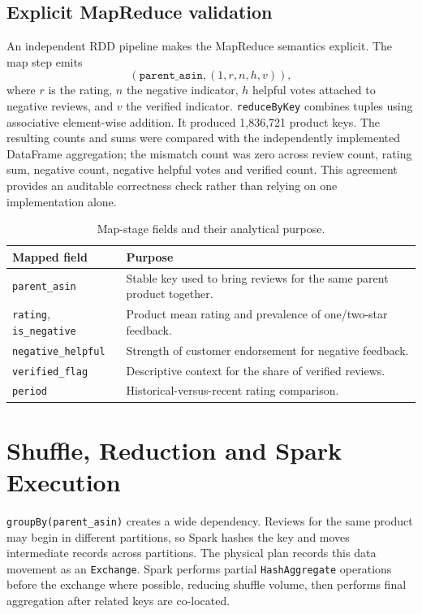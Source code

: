 \documentclass[10pt,a4paper]{article}
\begin{document}
\subsection{Explicit MapReduce validation}

An independent RDD pipeline makes the MapReduce semantics explicit. The map step emits
\[
(\texttt{parent\_asin},(1,r,n,h,v)),
\]
where $r$ is the rating, $n$ the negative indicator, $h$ helpful votes attached to negative reviews, and $v$ the verified indicator. \texttt{reduceByKey} combines tuples using associative element-wise addition. It produced 1,836,721 product keys. The resulting counts and sums were compared with the independently implemented DataFrame aggregation; the mismatch count was zero across review count, rating sum, negative count, negative helpful votes and verified count. This agreement provides an auditable correctness check rather than relying on one implementation alone.

\begin{table}[H]
\centering\small
\caption{Map-stage fields and their analytical purpose.}
\begin{tabularx}{\textwidth}{@{}lY@{}}\toprule
Mapped field & Purpose \\\midrule
\texttt{parent\_asin} & Stable key used to bring reviews for the same parent product together. \\
\texttt{rating}, \texttt{is\_negative} & Product mean rating and prevalence of one/two-star feedback. \\
\texttt{negative\_helpful} & Strength of customer endorsement for negative feedback. \\
\texttt{verified\_flag} & Descriptive context for the share of verified reviews. \\
\texttt{period} & Historical-versus-recent rating comparison. \\\bottomrule
\end{tabularx}
\end{table}

\newpage
\section{Shuffle, Reduction and Spark Execution}

\texttt{groupBy(parent\_asin)} creates a wide dependency. Reviews for the same product may begin in different partitions, so Spark hashes the key and moves intermediate records across partitions. The physical plan records this data movement as an \texttt{Exchange}. Spark performs partial \texttt{HashAggregate} operations before the exchange where possible, reducing shuffle volume, then performs final aggregation after related keys are co-located.
\end{document}
